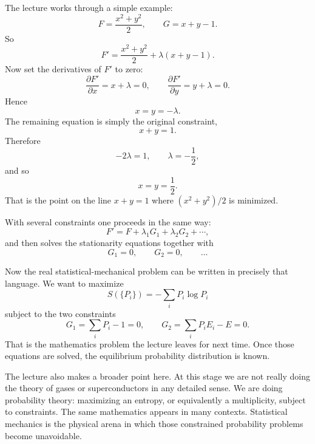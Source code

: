 The lecture works through a simple example:
\begin{equation}
F=\frac{x^2+y^2}{2},
\qquad
G=x+y-1.
\end{equation}
So
\begin{equation}
F'=\frac{x^2+y^2}{2}+\lambda(x+y-1).
\end{equation}
Now set the derivatives of \(F'\) to zero:
\begin{equation}
\frac{\partial F'}{\partial x}=x+\lambda=0,
\qquad
\frac{\partial F'}{\partial y}=y+\lambda=0.
\end{equation}
Hence
\begin{equation}
x=y=-\lambda.
\end{equation}
The remaining equation is simply the original constraint,
\begin{equation}
x+y=1.
\end{equation}
Therefore
\begin{equation}
-2\lambda=1,
\qquad
\lambda=-\frac12,
\end{equation}
and so
\begin{equation}
x=y=\frac12.
\end{equation}
That is the point on the line \(x+y=1\) where \((x^2+y^2)/2\) is minimized.

With several constraints one proceeds in the same way:
\begin{equation}
F'=F+\lambda_1 G_1+\lambda_2 G_2+\cdots,
\end{equation}
and then solves the stationarity equations together with
\begin{equation}
G_1=0,\qquad G_2=0,\qquad \dots
\end{equation}

Now the real statistical-mechanical problem can be written in precisely that language. We want to maximize
\begin{equation}
S(\{P_i\})=-\sum_i P_i\log P_i
\end{equation}
subject to the two constraints
\begin{equation}
G_1=\sum_i P_i-1=0,
\qquad
G_2=\sum_i P_iE_i-E=0.
\end{equation}
That is the mathematics problem the lecture leaves for next time. Once those equations are solved, the equilibrium probability distribution is known.

The lecture also makes a broader point here. At this stage we are not really doing the theory of gases or superconductors in any detailed sense. We are doing probability theory: maximizing an entropy, or equivalently a multiplicity, subject to constraints. The same mathematics appears in many contexts. Statistical mechanics is the physical arena in which those constrained probability problems become unavoidable.

